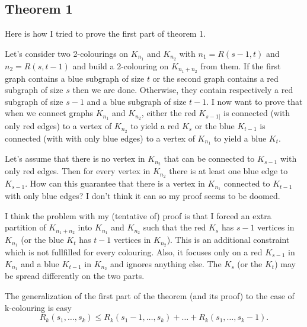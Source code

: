 \subsection{Theorem 1}

Here is how I tried to prove the first part of theorem 1.

Let's consider two 2-colourings on $K_{n_1}$ and $K_{n_2}$ with $n_1 = R(s-1,t)$ and $n_2 = R(s,t-1)$ and build a 2-colouring on $K_{n_1 + n_2}$ from them.
If the first graph contains a blue subgraph of size $t$ or the second graph contains a red subgraph of size $s$ then we are done.
Otherwise, they contain respectively a red subgraph of size $s-1$ and a blue subgraph of size $t-1$.
I now want to prove that when we connect graphs $K_{n_1}$ and $K_{n_2}$,
either the red $K_{s-1]}$ is connected (with only red edges) to a vertex of $K_{n_2}$ to yield a red $K_s$
or the blue $K_{t-1}$ is connected (with with only blue edges) to a vertex of $K_{n_1}$ to yield a blue $K_t$.

Let's assume that there is no vertex in $K_{n_2}$ that can be connected to $K_{s-1}$ with only red edges.
Then for every vertex in $K_{n_2}$ there is at least one blue edge to $K_{s-1}$.
How can this guarantee that there is a vertex in $K_{n_1}$ connected to $K_{t-1}$ with only blue edges?
I don't think it can so my proof seems to be doomed.

I think the problem with my (tentative of) proof is that I forced an extra partition of $K_{n_1+n_2}$ into $K_{n_1}$ and $K_{n_2}$
such that the red $K_s$ has $s-1$ vertices in $K_{n_1}$ (or the blue $K_t$ has $t-1$ vertices in $K_{n_2}$).
This is an additional constraint which is not fullfilled for every colouring.
Also, it focuses only on a red $K_{s-1}$ in $K_{n_1}$ and a blue $K_{t-1}$ in $K_{n_2}$ and ignores anything else.
The $K_s$ (or the $K_t$) may be spread differently on the two parts.

\medskip

The generalization of the first part of the theorem (and its proof) to the case of k-colouring is easy
\begin{equation}
    \label{eq:generalRamseyUpperBound}
    R_k(s_1,\dots,s_k) \leq R_k(s_1-1,\dots,s_k) + \dots + R_k(s_1,\dots,s_k-1) .
\end{equation}

